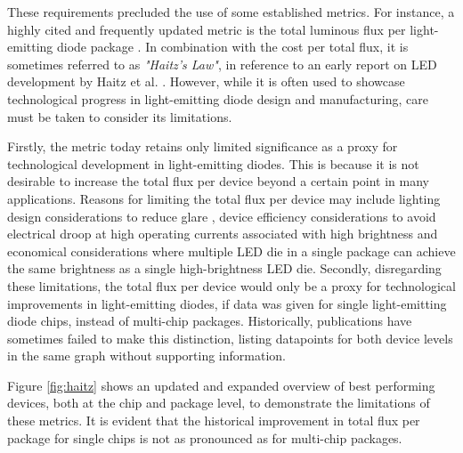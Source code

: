 \documentclass[a4paper,nocompress]{spie}  %
\begin{document}
    These requirements precluded the use of some established metrics. For instance, a highly cited and frequently updated metric is the total luminous flux per light-emitting diode package \cite{Liu2009,haitz2011solid,cho2017white,Fontoynont2018}. In combination with the cost per total flux, it is sometimes referred to as \textit{"Haitz's Law"}, in reference to an early report on LED development by Haitz et al. \cite{haitz1999case}. However, while it is often used to showcase technological progress in light-emitting diode design and manufacturing, care must be taken to consider its limitations.
    
    Firstly, the metric today retains only limited significance as a proxy for technological development in light-emitting diodes. This is because it is not desirable to increase the total flux per device beyond a certain point in many applications. Reasons for limiting the total flux per device may include lighting design considerations to reduce glare \cite{khan2015led}, device efficiency considerations to avoid electrical droop at high operating currents associated with high brightness \cite{Piprek2010} and economical considerations where multiple LED die in a single package can achieve the same brightness as a single high-brightness LED die. Secondly, disregarding these limitations, the total flux per device would only be a proxy for technological improvements in light-emitting diodes, if data was given for single light-emitting diode chips, instead of multi-chip packages. Historically, publications have sometimes failed to make this distinction, listing datapoints for both device levels in the same graph without supporting information.

    Figure \ref{fig:haitz} shows an updated and expanded overview of best performing devices, both at the chip and package level, to demonstrate the limitations of these metrics. It is evident that the historical improvement in total flux per package for single chips is not as pronounced as for multi-chip packages.
\end{document}
